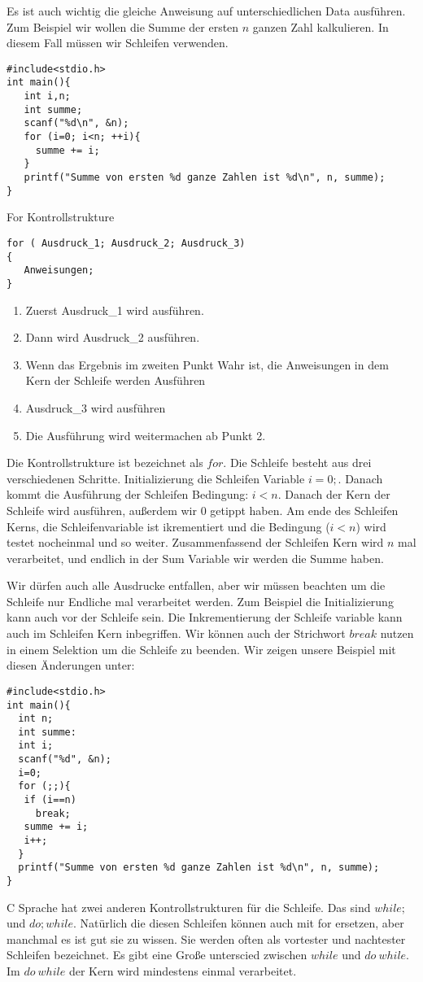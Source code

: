 Es ist auch wichtig die gleiche Anweisung auf unterschiedlichen Data ausführen. Zum Beispiel wir wollen die Summe der ersten
$n$ ganzen Zahl kalkulieren. In diesem Fall müssen wir Schleifen verwenden. 
\begin{lstlisting}
#include<stdio.h>
int main(){
   int i,n;
   int summe;
   scanf("%d\n", &n);
   for (i=0; i<n; ++i){
     summe += i; 
   }
   printf("Summe von ersten %d ganze Zahlen ist %d\n", n, summe);
}
\end{lstlisting}
\begin{myalertblock}{For Kontrollstrukture}
\begin{lstlisting}
for ( Ausdruck_1; Ausdruck_2; Ausdruck_3) 
{
   Anweisungen;
}
\end{lstlisting}
\vspace{-1cm}
\begin{enumerate}
\item Zuerst Ausdruck\_1 wird ausführen.
\item Dann wird Ausdruck\_2 ausführen.
\item Wenn das Ergebnis im zweiten Punkt Wahr ist, die Anweisungen 
in dem Kern der Schleife werden Ausführen
\item Ausdruck\_3 wird ausführen
\item Die Ausführung wird weitermachen ab Punkt 2.
\end{enumerate}
\end{myalertblock}


Die Kontrollstrukture ist bezeichnet als $for$. Die Schleife besteht aus drei verschiedenen Schritte.
Initializierung die Schleifen Variable $i=0;$. Danach kommt die Ausführung der Schleifen Bedingung: $i<n$.
Danach der Kern der Schleife wird ausführen, außerdem wir 0 getippt haben. Am ende des Schleifen Kerns,
die Schleifenvariable ist ikrementiert und die Bedingung ($i<n$) wird testet nocheinmal und so weiter.
Zusammenfassend der Schleifen Kern wird $n$ mal verarbeitet, und endlich in der Sum Variable wir 
werden die Summe haben.

Wir dürfen auch alle Ausdrucke entfallen,  aber wir müssen beachten um die Schleife nur Endliche mal 
verarbeitet werden. Zum Beispiel die Initializierung kann auch vor der Schleife sein. Die Inkrementierung 
der Schleife variable kann auch im Schleifen Kern inbegriffen. Wir können auch der Strichwort $break$ nutzen 
in einem Selektion um die Schleife zu beenden. Wir zeigen unsere Beispiel mit diesen Änderungen unter:

\begin{lstlisting}
#include<stdio.h>
int main(){
  int n;
  int summe:
  int i;
  scanf("%d", &n);
  i=0;
  for (;;){
   if (i==n)
     break;
   summe += i;
   i++;
  }
  printf("Summe von ersten %d ganze Zahlen ist %d\n", n, summe);
}
\end{lstlisting}
C Sprache hat zwei anderen Kontrollstrukturen für die Schleife. Das sind $while;$ und $do; while$.
Natürlich die diesen Schleifen können auch mit for ersetzen, aber manchmal es ist gut sie zu wissen.
Sie werden often als vortester und nachtester Schleifen bezeichnet. Es gibt eine Große unterscied zwischen
$while$ und $do~while$. Im $do~while$ der Kern wird mindestens einmal verarbeitet. 

